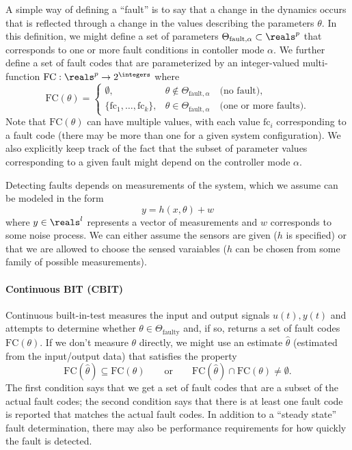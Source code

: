 \documentclass{article}
\begin{document}
A simple way of defining a ``fault'' is to say that a change in the
dynamics occurs that is reflected through a change in the values
describing the parameters $\theta$.  In this definition, we might
define a set of parameters $\Theta_{\text{fault},\alpha} \subset
\reals^p$ that corresponds to one or more fault conditions in contoller
mode $\alpha$.  We further define a set of fault codes that are
parameterized by an integer-valued multi-function $\text{FC}:\reals^p
\to 2^\integers$ where
\begin{displaymath}
  \text{FC}(\theta) = 
  \begin{cases}
    \emptyset, & \theta \notin \Theta_{\text{fault},\alpha}
      \quad\text{(no fault)}, \\
    \{\text{fc}_1, \dots, \text{fc}_k\},
      & \theta \in \Theta_{\text{fault},\alpha}
        \quad\text{(one or more faults)}.
  \end{cases}
\end{displaymath}
Note that $\text{FC}(\theta)$ can have multiple values, with each
value $\text{fc}_i$ corresponding to a fault code (there may be more
than one for a given system configuration).  We also explicitly keep
track of the fact that the subset of parameter values corresponding to
a given fault might depend on the controller mode $\alpha$.

Detecting faults depends on measurements of the system, which we
assume can be modeled in the form
\begin{displaymath}
  y = h(x, \theta) + w
\end{displaymath}
where $y \in \reals^l$ represents a vector of measurements and $w$
corresponds to some noise process.  We can either assume the sensors
are given ($h$ is specified) or that we are allowed to choose the
sensed varaiables ($h$ can be chosen from some family of possible
measurements).

\paragraph{Continuous BIT (CBIT)}
Continuous built-in-test measures the input and output signals $u(t),
y(t)$ and attempts to determine whether $\theta \in
\Theta_\text{faulty}$ and, if so, returns a set of fault codes
$\text{FC}(\theta)$.  If we don't measure $\theta$ directly, we might
use an estimate $\hat\theta$ (estimated from the input/output data)
that satisfies the property
\begin{displaymath}
  \text{FC}(\hat\theta) \subseteq \text{FC}(\theta)
  \qquad\text{or}\qquad
  \text{FC}(\hat\theta) \cap \text{FC}(\theta) \neq \emptyset.
\end{displaymath}
The first condition says that we get a set of fault codes that are a
subset of the actual fault codes; the second condition says that there
is at least one fault code is reported that matches the actual fault
codes.  In addition to a ``steady state'' fault determination, there
may also be performance requirements for how quickly the fault is
detected. 
\end{document}
